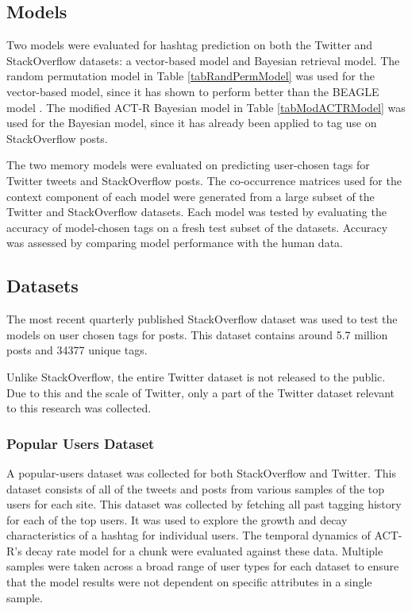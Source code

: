 \documentclass[man,floatsintext,donotrepeattitle]{apa6}
\begin{document}
\subsection{Models}

Two models were evaluated for hashtag prediction on both the Twitter and StackOverflow datasets: a vector-based model and Bayesian retrieval model.
The random permutation model \parencite{Sahlgren2008} in Table \ref{tabRandPermModel} was used for the vector-based model, since it has shown to perform better than the BEAGLE model \parencite{Recchia2010}.
The modified ACT-R Bayesian model \parencite{Stanley2013} in Table \ref{tabModACTRModel} was used for the Bayesian model, since it has already been applied to tag use on StackOverflow posts.

The two memory models were evaluated on predicting user-chosen tags for Twitter tweets and StackOverflow posts.
The co-occurrence matrices used for the context component of each model were generated from a large subset of the Twitter and StackOverflow datasets.
Each model was tested by evaluating the accuracy of model-chosen tags on a fresh test subset of the datasets.
Accuracy was assessed by comparing model performance with the human data.

\subsection{Datasets}

The most recent quarterly published StackOverflow dataset \parencite{DataDump2014} was used to test the models on user chosen tags for posts.
This dataset contains around \num{5.7} million posts and \num{34377} unique tags.

Unlike StackOverflow, the entire Twitter dataset is not released to the public.
Due to this and the scale of Twitter, only a part of the Twitter dataset relevant to this research was collected.

\subsubsection{Popular Users Dataset}

A popular-users dataset was collected for both StackOverflow and Twitter.
This dataset consists of all of the tweets and posts from various samples of the top users for each site.
This dataset was collected by fetching all past tagging history for each of the top users.
It was used to explore the growth and decay characteristics of a hashtag for individual users.
The temporal dynamics of ACT-R's decay rate model for a chunk were evaluated against these data.
Multiple samples were taken across a broad range of user types for each dataset to ensure that the model results were not dependent on specific attributes in a single sample.
\end{document}
